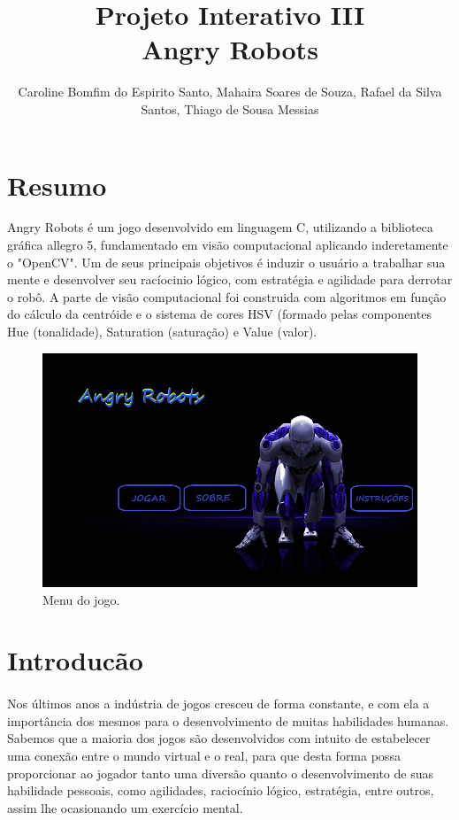 \documentclass{sciposter}
\title{Projeto Interativo III\\ Angry Robots}
\author{Caroline Bomfim do Espirito Santo, Mahaira Soares de Souza, Rafael da Silva Santos, Thiago de Sousa Messias}
\institute 
{Bacharelado em Ciência da Computação\\
Centro Universitário SENAC - Campus Santo Amaro
(SENAC-SP)\\
Av. Engenheiro Eusébio Stevaux, 823 -- Santo Amaro, São Paulo -- CEP 04696-000 -- SP -- Brasil}
\begin{document}

\maketitle

\begin{multicols}{3}
\section {Resumo}

Angry Robots é um jogo desenvolvido em linguagem C, utilizando a biblioteca gráfica allegro 5, fundamentado em visão computacional aplicando inderetamente o "OpenCV". Um de seus principais objetivos é induzir o usuário a trabalhar sua mente e desenvolver seu racíocinio lógico, com estratégia e agilidade para derrotar o robô. A parte de visão computacional foi construida com algoritmos em função do cálculo da centróide e o sistema de cores HSV (formado pelas componentes Hue (tonalidade), Saturation (saturação) e Value (valor).

\begin{figure}[!htb]
\centering
\includegraphics[scale=0.8]{menu.png}
\caption{Menu do jogo.}
\end{figure}

\section{Introducão}
\paragraph{}Nos últimos anos a indústria de jogos cresceu de forma constante, e com ela a importância dos mesmos para o desenvolvimento de muitas habilidades humanas. Sabemos que a maioria dos jogos são desenvolvidos com intuito de estabelecer uma conexão entre o mundo virtual e o real, para que desta forma possa proporcionar ao jogador tanto uma diversão quanto o desenvolvimento de suas habilidade pessoais, como agilidades, raciocínio lógico, estratégia, entre outros, assim lhe ocasionando um exercício mental.

\end{multicols}
\end{document}
